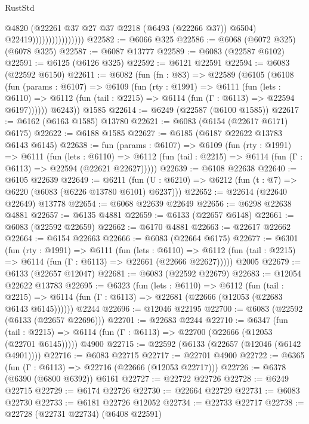 \begin{lexlean}{RustStd}
\begin{coremodule}
                                    @4820
                                    (@22261 @37 @27 @37 @2218 (@6493 (@22266 @37)) @6504)
                                    @22419))))))))))))))))
@22582 := @6066 @325
@22586 := @6068 (@6072 @325) (@6078 @325)
@22587 := @6087 @13777
@22589 := @6083 (@22587 @6102)
@22591 := @6125 (@6126 @325)
@22592 := @6121 @22591
@22594 := @6083 (@22592 @6150)
@22611 := @6082
    (fun (fn : @83) =>
    @22589
      (@6105
        (@6108
          (fun (params : @6107) =>
          @6109
            (fun (rty : @1991) =>
            @6111
              (fun (lets : @6110) =>
              @6112 (fun (tail : @2215) => @6114 (fun (Γ : @6113) => @22594 @6197))))))
        @6243))
    @1585
@22614 := @6249 (@22587 (@6100 @1585))
@22617 := @6162 (@6163 @1585) @13780
@22621 := @6083 (@6154 (@22617 @6171) @6175)
@22622 := @6188 @1585
@22627 := @6185 (@6187 @22622 @13783 @6143 @6145)
@22638 := fun (params : @6107) =>
  @6109
    (fun (rty : @1991) =>
    @6111
      (fun (lets : @6110) =>
      @6112 (fun (tail : @2215) => @6114 (fun (Γ : @6113) => @22594 (@22621 @22627)))))
@22639 := @6108 @22638
@22640 := @6105 @22639
@22649 := @6211
    (fun (U : @6210) => @6212 (fun (t : @7) => @6220 (@6083 (@6226 @13780 @6101) @6237)))
@22652 := @22614 (@22640 @22649) @13778
@22654 := @6068 @22639 @22649
@22656 := @6298 @22638 @4881
@22657 := @6135 @4881
@22659 := @6133 (@22657 @6148)
@22661 := @6083 (@22592 @22659)
@22662 := @6170 @4881
@22663 := @22617 @22662
@22664 := @6154 @22663
@22666 := @6083 (@22664 @6175)
@22677 := @6301
    (fun (rty : @1991) =>
    @6111
      (fun (lets : @6110) =>
      @6112 (fun (tail : @2215) => @6114 (fun (Γ : @6113) => @22661 (@22666 @22627)))))
    @2005
@22679 := @6133 (@22657 @12047)
@22681 := @6083 (@22592 @22679)
@22683 := @12054 @22622 @13783
@22695 := @6323
    (fun (lets : @6110) =>
    @6112
      (fun (tail : @2215) =>
      @6114 (fun (Γ : @6113) => @22681 (@22666 (@12053 (@22683 @6143 @6145))))))
    @2244
@22696 := @12046 @22195
@22700 := @6083 (@22592 (@6133 (@22657 @22696)))
@22701 := @22683 @2244
@22710 := @6347
    (fun (tail : @2215) => @6114 (fun (Γ : @6113) => @22700 (@22666 (@12053 (@22701 @6145)))))
    @4900
@22715 := @22592 (@6133 (@22657 (@12046 (@6142 @4901))))
@22716 := @6083 @22715
@22717 := @22701 @4900
@22722 := @6365 (fun (Γ : @6113) => @22716 (@22666 (@12053 @22717)))
@22726 := @6378 (@6390 (@6800 @6392)) @6161
@22727 := @22722 @22726
@22728 := @6249 @22715
@22729 := @6174 @22726
@22730 := @22664 @22729
@22731 := @6083 @22730
@22733 := @6181 @22726 @12052
@22734 := @22733 @22717
@22738 := @22728 (@22731 @22734) (@6408 @22591)

\end{coremodule}
\end{lexlean}
